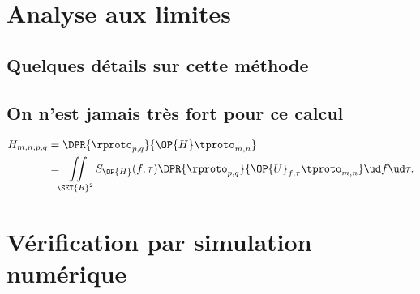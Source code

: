 \section{Analyse aux limites}


\subsection{Quelques détails sur cette méthode}


\subsection{On n'est jamais très fort pour ce calcul}


\begin{align}
H_{m,n,p,q} &= \DPR{\rproto_{p,q}}{\OP{H} \tproto_{m,n}}\\
&= \iint\limits_{\SET{R}^2} S_{\OP{H}}(f,\tau) \DPR{\rproto_{p,q}}{\OP{U}_{f,\tau} \tproto_{m,n}} \ud f \ud \tau.
\end{align}

\section{Vérification par simulation numérique}


